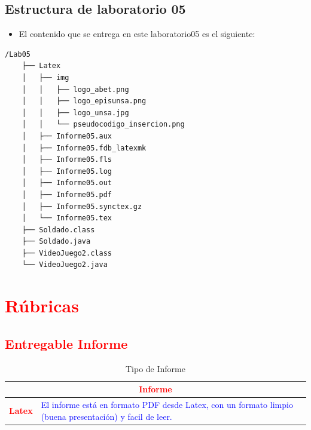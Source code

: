 \documentclass{article}
\begin{document}
	\subsection{Estructura de laboratorio 05}
	\begin{itemize}	
		\item El contenido que se entrega en este laboratorio05 es el siguiente:
	\end{itemize}
	\begin{lstlisting}[style=ascii-tree]
	/Lab05 		
	├── Latex
	│   ├── img
	│   │   ├── logo_abet.png
	│   │   ├── logo_episunsa.png
	│   │   ├── logo_unsa.jpg
	│   │   └── pseudocodigo_insercion.png
	│   ├── Informe05.aux
	│   ├── Informe05.fdb_latexmk
	│   ├── Informe05.fls
	│   ├── Informe05.log
	│   ├── Informe05.out
	│   ├── Informe05.pdf
	│   ├── Informe05.synctex.gz
	│   └── Informe05.tex
	├── Soldado.class
	├── Soldado.java
	├── VideoJuego2.class
	└── VideoJuego2.java

	\end{lstlisting}    
	\section{\textcolor{red}{Rúbricas}}
	
	\subsection{\textcolor{red}{Entregable Informe}}
	\begin{table}[H]
		\caption{Tipo de Informe}
		\setlength{\tabcolsep}{0.5em} %
		{\renewcommand{\arraystretch}{1.5}%
		\begin{tabular}{|p{3cm}|p{12cm}|}
			\hline
			\multicolumn{2}{|c|}{\textbf{\textcolor{red}{Informe}}}  \\
			\hline 
			\textbf{\textcolor{red}{Latex}} & \textcolor{blue}{El informe está en formato PDF desde Latex,  con un formato limpio (buena presentación) y facil de leer.}   \\ 
			\hline 
			
			
		\end{tabular}
	}
	\end{table}
	
	\clearpage
	
\end{document}
